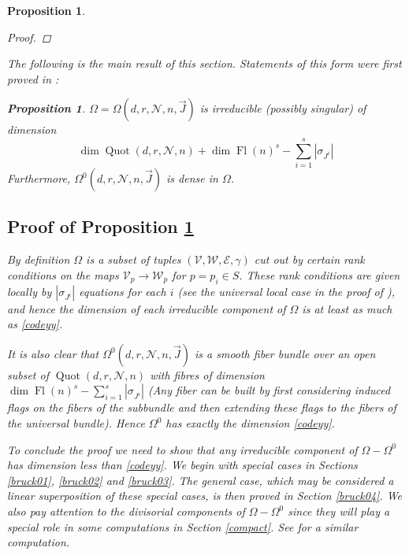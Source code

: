 \documentclass[11pt]{amsart}
\newcommand\me{\mathcal{E}}
\newcommand\Fl{\operatorname{Fl}}
\newcommand\mv{\mathcal{V}}
\newcommand\mw{\mathcal{W}}
\newcommand\mn{\mathcal{N}}
\newcommand\Quot{\operatorname{Quot}}
\newtheorem{proposition}[theorem]{Proposition}
\numberwithin{theorem}{subsection}
\begin{document}
{\begin{proposition}
\begin{proof}
\end{proof}

The following is the main result of this section. Statements of this form were first proved in \cite{bertie}:
 \begin{proposition}\label{maya}
  $\Omega=\Omega(d,r,\mn,n,\vec{J})$ is irreducible (possibly singular) of dimension
 \begin{equation}\label{codeyy}
\dim \Quot(d,r,\mn,n) + \dim \Fl(n)^s -\sum_{i=1}^s |\sigma_{J^i}|
\end{equation}
Furthermore, $\Omega^0(d,r,\mn,n,\vec{J})$ is dense in $\Omega$.
 \end{proposition}
\subsection{Proof of Proposition \ref{maya}}
 By definition $\Omega$ is a subset of  tuples $(\mv,\mw,\me,\gamma)$ cut out by certain rank conditions on the maps $\mv_p\to \mw_p$ for $p=p_i\in S$. These rank conditions are given locally by $ |\sigma_{J^i}|$ equations for each $i$ (see the universal local case in the proof of \cite[Theorem 14.3]{FInt}), and hence the dimension of each irreducible component of $\Omega$ is at least as much as \eqref{codeyy}.

 It is also clear that $\Omega^0(d,r,\mn,n,\vec{J})$ is a smooth fiber bundle over an open subset of $\Quot(d,r,\mn,n)$ with fibres of dimension  $\dim \Fl(n)^s -\sum_{i=1}^s |\sigma_{J^i}|$ (Any fiber can be built by first considering induced flags on the  fibers of the subbundle and then extending these flags to the fibers of the universal bundle). Hence $\Omega^0$ has exactly the dimension \eqref{codeyy}.

 To conclude the proof we need to show that any irreducible component of $\Omega-\Omega^0$ has dimension less than \eqref{codeyy}.  We begin with  special cases in Sections \ref{bruck01}, \ref{bruck02} and \ref{bruck03}. The general case, which may be considered a linear superposition of these special cases,  is then proved in Section \ref{bruck04}. We also pay attention to  the divisorial components of  $\Omega-\Omega^0$ since they will play a special role in some computations in Section \ref{compact}.
 See \cite[Section 12.1]{BGM} for a similar computation.


\end{proposition}}
\end{document}
